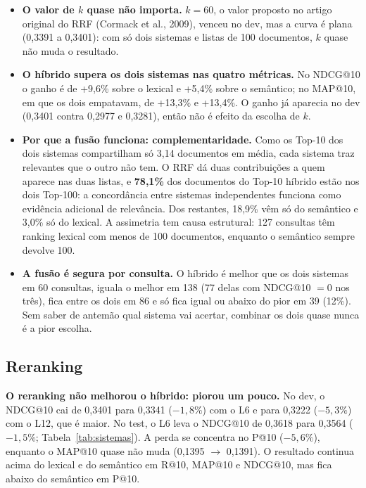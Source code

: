 \documentclass[10pt,a4paper]{article}
\begin{document}
\begin{itemize}
\item \textbf{O valor de $k$ quase não importa.} $k = 60$, o valor proposto no artigo original do RRF (Cormack et al., 2009), venceu no dev, mas a curva é plana (0,3391 a 0,3401): com só dois sistemas e listas de 100 documentos, $k$ quase não muda o resultado.
\item \textbf{O híbrido supera os dois sistemas nas quatro métricas.} No NDCG@10 o ganho é de +9,6\% sobre o lexical e +5,4\% sobre o semântico; no MAP@10, em que os dois empatavam, de +13,3\% e +13,4\%. O ganho já aparecia no dev (0,3401 contra 0,2977 e 0,3281), então não é efeito da escolha de $k$.
\item \textbf{Por que a fusão funciona: complementaridade.} Como os Top-10 dos dois sistemas compartilham só 3,14 documentos em média, cada sistema traz relevantes que o outro não tem. O RRF dá duas contribuições a quem aparece nas duas listas, e \textbf{78,1\%} dos documentos do Top-10 híbrido estão nos dois Top-100: a concordância entre sistemas independentes funciona como evidência adicional de relevância. Dos restantes, 18,9\% vêm só do semântico e 3,0\% só do lexical. A assimetria tem causa estrutural: 127 consultas têm ranking lexical com menos de 100 documentos, enquanto o semântico sempre devolve 100.
\item \textbf{A fusão é segura por consulta.} O híbrido é melhor que os dois sistemas em 60 consultas, iguala o melhor em 138 (77 delas com NDCG@10 $= 0$ nos três), fica entre os dois em 86 e só fica igual ou abaixo do pior em 39 (12\%). Sem saber de antemão qual sistema vai acertar, combinar os dois quase nunca é a pior escolha.
\end{itemize}

\subsection{Reranking}
\label{sec:res-rerank}

\textbf{O reranking não melhorou o híbrido: piorou um pouco.} No dev, o NDCG@10 cai de 0,3401 para 0,3341 ($-1{,}8\%$) com o L6 e para 0,3222 ($-5{,}3\%$) com o L12, que é maior. No test, o L6 leva o NDCG@10 de 0,3618 para 0,3564 ($-1{,}5\%$; Tabela~\ref{tab:sistemas}). A perda se concentra no P@10 ($-5{,}6\%$), enquanto o MAP@10 quase não muda (0,1395 $\to$ 0,1391). O resultado continua acima do lexical e do semântico em R@10, MAP@10 e NDCG@10, mas fica abaixo do semântico em P@10.
\end{document}
